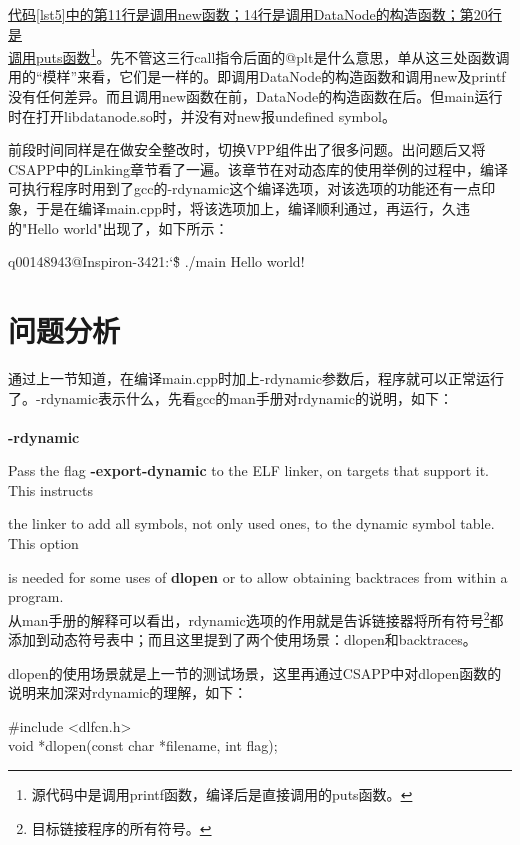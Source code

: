 \documentclass[a4paper, 12pt, titlepage]{article}
\begin{document}
\underline{代码\ref{lst5}中的第11行是调用new函数；14行是调用DataNode的构造函数；第20行是}\\\underline{调用puts函数}\footnote{源代码中是调用printf函数，编译后是直接调用的puts函数。}。先不管这三行call指令后面的@plt是什么意思，单从这三处函数调用的“模样”来看，它们是一样的。即调用DataNode的构造函数和调用new及printf没有任何差异。而且调用new函数在前，DataNode的构造函数在后。但main运行时在打开libdatanode.so时，并没有对new报undefined symbol。

前段时间同样是在做安全整改时，切换VPP组件出了很多问题。出问题后又将CSAPP中的Linking章节看了一遍。该章节在对动态库的使用举例的过程中，编译可执行程序时用到了gcc的-rdynamic这个编译选项，对该选项的功能还有一点印象，于是在编译main.cpp时，将该选项加上，编译顺利通过，再运行，久违的"Hello world"出现了，如下所示：
\begin{tcolorbox}[colback=green!5!white,colframe=orange]
  q00148943@Inspiron-3421:\char`\~\$ ./main
  \tcblower
  Hello world!
\end{tcolorbox}

\section{问题分析}
通过上一节知道，在编译main.cpp时加上-rdynamic参数后，程序就可以正常运行了。-rdynamic表示什么，先看gcc的man手册对rdynamic的说明，如下：\\\\
\textbf{-rdynamic}

Pass the flag \textbf{-export-dynamic} to the ELF linker, on targets that support it. This instructs

the linker to add all symbols, not only used ones, to the dynamic symbol table. This option

is needed for some uses of \textbf{dlopen} or to allow obtaining backtraces from within a program.\\

从man手册的解释可以看出，rdynamic选项的作用就是告诉链接器将所有符号\footnote{目标链接程序的所有符号。}都添加到{\color{seco}动态}符号表中；而且这里提到了两个使用场景：dlopen和backtraces。

dlopen的使用场景就是上一节的测试场景，这里再通过CSAPP中对dlopen函数的说明来加深对rdynamic的理解，如下：
\begin{tcolorbox}[colback=green!5!white,colframe=orange]
\#include <dlfcn.h>\\
void *dlopen(const char *filename, int flag);
\end{tcolorbox}
\end{document}

